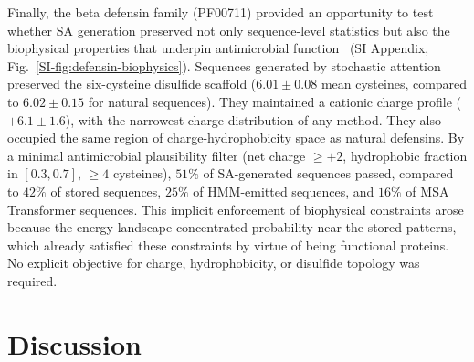 \documentclass[11pt,onecolumn,twoside,lineno]{pnas-new}
\begin{document}
Finally, the beta defensin family (PF00711) provided an opportunity to test whether SA generation preserved not only sequence-level statistics but also the biophysical properties that underpin antimicrobial function~\cite{lazzaroAntimicrobialPeptides2020} (SI Appendix, Fig.~\ref{SI-fig:defensin-biophysics}). Sequences generated by stochastic attention preserved the six-cysteine disulfide scaffold ($6.01 \pm 0.08$ mean cysteines, compared to $6.02 \pm 0.15$ for natural sequences). They maintained a cationic charge profile ($+6.1 \pm 1.6$), with the narrowest charge distribution of any method. They also occupied the same region of charge-hydrophobicity space as natural defensins. By a minimal antimicrobial plausibility filter (net charge $\geq +2$, hydrophobic fraction in $[0.3, 0.7]$, $\geq 4$ cysteines), $51\%$ of SA-generated sequences passed, compared to $42\%$ of stored sequences, $25\%$ of HMM-emitted sequences, and $16\%$ of MSA Transformer sequences. This implicit enforcement of biophysical constraints arose because the energy landscape concentrated probability near the stored patterns, which already satisfied these constraints by virtue of being functional proteins. No explicit objective for charge, hydrophobicity, or disulfide topology was required.

\section*{Discussion}
\end{document}
